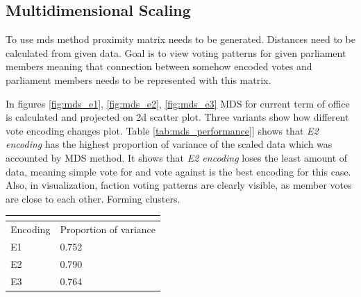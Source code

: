 \documentclass[a4paper,12pt]{article}
\begin{document}
   	\clearpage
   	   	
   	\subsection{Multidimensional Scaling}
   	
   	To use \acrshort{mds} method proximity matrix needs to be generated. Distances need to be calculated from given data. Goal is to view voting patterns for given parliament members meaning that connection between somehow encoded votes and parliament members needs to be represented with this matrix.
   	
   	In figures \ref{fig:mds_e1}, \ref{fig:mds_e2}, \ref{fig:mds_e3} MDS for current term of office is calculated and projected on 2d scatter plot. Three variants show how different vote encoding changes plot. Table \ref{tab:mds_performance]} shows that \textit{E2 encoding} has the highest proportion of variance of the scaled data which was accounted by MDS method. It shows that \textit{E2 encoding} loses the least amount of data, meaning simple vote for and vote against is the best encoding for this case. Also, in visualization, faction voting patterns are clearly visible, as member votes are close to each other. Forming clusters.
   	
   	\noindent
   	\begin{center}
   		\begin{tabular}{L{2cm} C{4cm}}
   			\\ 
   			\hline
   			Encoding & Proportion of variance \\\hline
   			E1 & 0.752 \\
   			E2 & 0.790 \\
   			E3 & 0.764 \\
   			\hline
   		\end{tabular}
   		 \label{tab:mds_performance]}
   	\end{center} 
   
\end{document}
